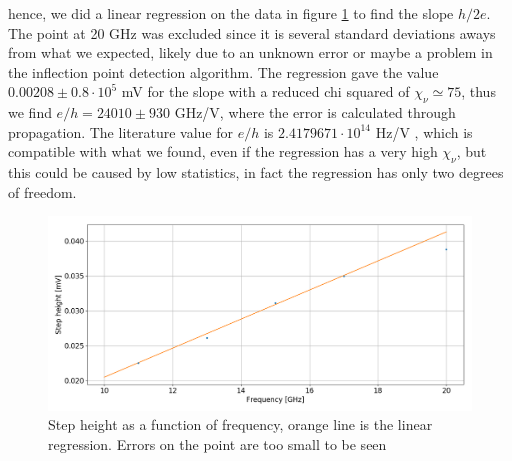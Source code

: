 \documentclass[a4paper,10pt]{article}
\begin{document}
hence, we did a linear regression on the data in figure \ref{eh} to find the slope $h/2e$. The point at 20 GHz was excluded since it is several standard deviations aways from what we expected, likely due to an unknown error or maybe a problem in the inflection point detection algorithm. The regression gave the value $0.00208\pm 0.8\cdot 10^5$ mV for the slope with a reduced chi squared of $\chi_\nu \simeq 75$, thus we find $e/h = 24010 \pm 930$ GHz/V, where the error is calculated through propagation. The literature value for $e/h$ is $ 2.4179671\cdot 10^{14}$ Hz/V \cite{skriptum}, which is compatible with what we found, even if the regression has a very high $\chi_\nu$, but this could be caused by low statistics, in fact the regression has only two degrees of freedom.
\begin{figure}[H]
\centering
\includegraphics[width = \textwidth]{eh}
\caption{Step height as a function of frequency, orange line is the linear regression. Errors on the point are too small to be seen}\label{eh}
\end{figure}
\end{document}

